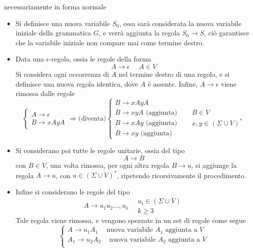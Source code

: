\documentclass[10pt, letterpaper]{report}
\begin{document}
necessariamente in forma normale\begin{itemize}
    \item Si definisce una nuova variabile $S_0$, essa sarà considerata la nuova variabile iniziale della grammatica 
    $G$, e verrà aggiunta la regola $S_0\rightarrow S$, ciò garantisce che la variabile iniziale non compare mai 
    come termine destro. 
    \item Data una $\epsilon$-regola, ossia le regole della forma 
    $$ A\longrightarrow \epsilon \ \ \ \ \ \ A\in V$$
    Si considera ogni occorrenza di $A$ nel termine destro di una regola, e si definisce una nuova regola 
    identica, dove $A$ è assente. Infine, $A\longrightarrow \epsilon$ viene rimossa dalle regole 
    $$ \begin{cases}
        A\longrightarrow \epsilon \\ 
        B\longrightarrow xAyA
    \end{cases} \Longrightarrow  \text{(diventa)}\begin{cases}
        B\longrightarrow xAyA\\ 
        B\longrightarrow xyA \text{ (aggiunta)}\\ 
        B\longrightarrow xAy \text{ (aggiunta)}\\ 
        B\longrightarrow xy \text{ (aggiunta)}
    \end{cases}\ \ \ \ \ \ \begin{matrix}
        B\in V\\ x,y\in (\Sigma\cup V)^*
    \end{matrix}$$
    \item Si considerano poi tutte le regole unitarie, ossia del tipo $$ A\longrightarrow B$$ con $B\in V$, una 
    volta rimossa, per ogni altra regola $B\rightarrow u$, si aggiunge la regola $A\rightarrow u$, con 
    $u\in(\Sigma\cup V)^*$, ripetendo ricorsivamente il procedimento. 
    \item Infine si considerano le regole del tipo 
    $$A\longrightarrow u_1u_2\dots,u_k \ \ \ \ \begin{matrix}u_i\in(\Sigma\cup V)\\k\ge 3 \end{matrix}$$
    Tale regola viene rimossa, e vengono spezzate in un set di regole come segue $$\begin{cases}
        A\longrightarrow u_1A_1 \ \ \ \ \text{ nuova variabile $A_1$ aggiunta a $V$}\\ 
        A_1\longrightarrow u_2A_2 \ \ \ \ \text{ nuova variabile $A_2$ aggiunta a $V$}\\ 

\end{cases}$$
\end{itemize}
\end{document}
